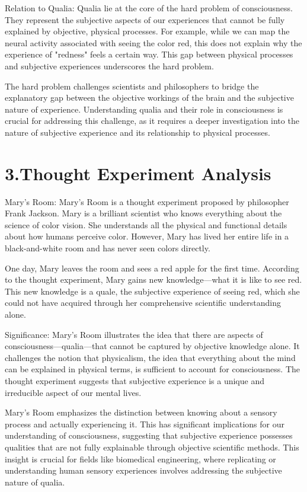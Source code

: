\documentclass{article}
\begin{document}
Relation to Qualia:
Qualia lie at the core of the hard problem of consciousness. They represent the subjective aspects of our experiences that cannot be fully explained by objective, physical processes. For example, while we can map the neural activity associated with seeing the color red, this does not explain why the experience of "redness" feels a certain way. This gap between physical processes and subjective experiences underscores the hard problem.

The hard problem challenges scientists and philosophers to bridge the explanatory gap between the objective workings of the brain and the subjective nature of experience. Understanding qualia and their role in consciousness is crucial for addressing this challenge, as it requires a deeper investigation into the nature of subjective experience and its relationship to physical processes.


\section*{3.Thought Experiment Analysis}
Mary's Room:
Mary's Room is a thought experiment proposed by philosopher Frank Jackson. Mary is a brilliant scientist who knows everything about the science of color vision. She understands all the physical and functional details about how humans perceive color. However, Mary has lived her entire life in a black-and-white room and has never seen colors directly.

One day, Mary leaves the room and sees a red apple for the first time. According to the thought experiment, Mary gains new knowledge—what it is like to see red. This new knowledge is a quale, the subjective experience of seeing red, which she could not have acquired through her comprehensive scientific understanding alone.

Significance:
Mary's Room illustrates the idea that there are aspects of consciousness—qualia—that cannot be captured by objective knowledge alone. It challenges the notion that physicalism, the idea that everything about the mind can be explained in physical terms, is sufficient to account for consciousness. The thought experiment suggests that subjective experience is a unique and irreducible aspect of our mental lives.

Mary's Room emphasizes the distinction between knowing about a sensory process and actually experiencing it. This has significant implications for our understanding of consciousness, suggesting that subjective experience possesses qualities that are not fully explainable through objective scientific methods. This insight is crucial for fields like biomedical engineering, where replicating or understanding human sensory experiences involves addressing the subjective nature of qualia.
\end{document}
